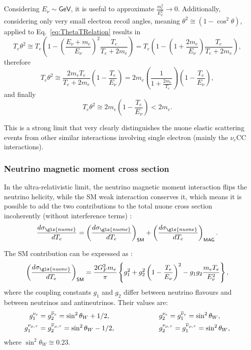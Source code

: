 Considering $E_{\nu}\sim\textsf{GeV}$, it is useful to approximate $\frac{m_e^2}{E_{\nu}^2}\rightarrow 0$. Additionally, considering only very small electron recoil angles, meaning $\theta^2\cong \left(1-\cos^2\theta\right)$, applied to Eq.~\ref{eq:ThetaTRelation} results in
\begin{equation}
T_e\theta^2\cong T_e\left(1-\left(\frac{E_\nu+m_e}{E_\nu}\right)^2\frac{T_e}{T_e+2m_e}\right)
=T_e\left(1-\left(1+\frac{2m_e}{E_\nu}\right)\frac{T_e}{T_e+2m_e}\right),
\end{equation}
therefore
\begin{equation}
T_e\theta^2\cong \frac{2m_eT_e}{T_e+2m_e}\left(1-\frac{T_e}{E_\nu}\right)=2m_e\left(\frac{1}{1+\frac{2m_e}{T_e}}\right)\left(1-\frac{T_e}{E_\nu}\right),
\end{equation}
and finally
\begin{equation}\label{eqTThetaSqExp}
T_e\theta^2\cong 2m_e\left(1-\frac{T_e}{E_{\nu}}\right)<2m_e.
\end{equation}

This is a strong limit that very clearly distinguishes the \gls{nuone} elastic scattering events from other similar interactions involving single electron (mainly the $\nu_e$\gls{CC} interactions).

\subsubsection{Neutrino magnetic moment cross section}
In the ultra-relativistic limit, the neutrino magnetic moment interaction flips the neutrino helicity, while the \gls{SM} weak interaction conserves it, which means it is possible to add the two contributions to the total \gls{nuone} cross section incoherently (without interference terms) \cite{nuElmagInt2015.pdf}:
\begin{equation}
\frac{d\sigma_{\gls{nuone}}}{dT_e}=\left(\frac{d\sigma_{\gls{nuone}}}{dT_e}\right)_{\textsf{SM}}+\left(\frac{d\sigma_{\gls{nuone}}}{dT_e}\right)_{\textsf{MAG}}.
\end{equation}

The \gls{SM} contribution can be expressed as \cite{FundamentalsOfNeutrinoPhysics.pdf, nuElmagInt2015.pdf}:
\begin{equation}\label{eq:NuMMSMCrossSection}
\left(\frac{d\sigma_{\gls{nuone}}}{dT_e}\right)_{\textsf{SM}}=\frac{2G_F^2m_e}{\pi}\left\lbrace g_1^2+g_2^2\left(1-\frac{T_e}{E_{\nu}}\right)^2-g_1 g_2\frac{m_eT_e}{E_{\nu}^2}\right\rbrace,
\end{equation}
where the coupling constants $g_1$ and $g_2$ differ between neutrino flavours and between neutrinos and antineutrinos. Their values are:
\begin{align}
g_1^{\nu_e}&=g_2^{\overline{\nu}_e}=\sin^2\theta_W+1/2,\hspace{2.5cm} g_2^{\nu_e}=g_1^{\overline{\nu}_e}=\sin^2\theta_W,\\
g_1^{\nu_{\mu,\tau}}&=g_2^{\overline{\nu}_{\mu,\tau}}=\sin^2\theta_W-1/2,\hspace{2.25cm} g_2^{\nu_{\mu,\tau}}=g_1^{\overline{\nu}_{\mu,\tau}}=\sin^2\theta_W,
\end{align}
where $\sin^2\theta_W\cong 0.23$.

